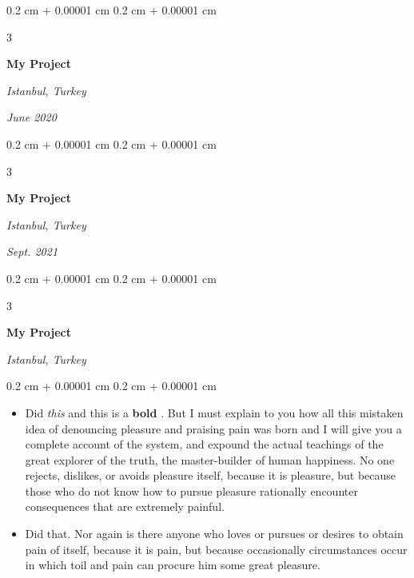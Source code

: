 \documentclass[10pt, letterpaper]{article}
\newenvironment{highlights}{
    \begin{itemize}[
        topsep=0.10 cm,
        parsep=0.10 cm,
        partopsep=0pt,
        itemsep=0pt,
        leftmargin=0.4 cm + 10pt + 0.6 cm
    ]
}{
    \end{itemize}
} %
\newenvironment{onecolentry}{
    \begin{adjustwidth}{
        0.2 cm + 0.00001 cm
    }{
        0.2 cm + 0.00001 cm
    }
}{
    \end{adjustwidth}
} %
\newenvironment{threecolentry}[3][]{
    \onecolentry
    \def\thirdColumn{#3}
    \setcolumnwidth{0.6 cm, \fill, 4.5 cm}
    \begin{paracol}{3}
    #2 \switchcolumn
}{
    \switchcolumn \raggedleft \thirdColumn
    \end{paracol}
    \endonecolentry
} %
\let\hrefWithoutArrow\href
\renewcommand{\href}[2]{\hrefWithoutArrow{#1}{\mbox{\ifthenelse{\equal{#2}{}}{ }{#2 }\raisebox{.15ex}{\footnotesize \faExternalLink*}}}}
\begin{document}
        \vspace{0.2 cm-3px}

        \begin{threecolentry}{
            \vspace*{\fill}
            \textbullet
            \vspace*{3px}
            \vspace*{\fill}
        }{
        \textit{Istanbul, Turkey}    
            
        \textit{June 2020}}
            \textbf{My Project}
        \end{threecolentry}



        \vspace{0.2 cm-3px}

        \begin{threecolentry}{
            \vspace*{\fill}
            \textbullet
            \vspace*{3px}
            \vspace*{\fill}
        }{
        \textit{Istanbul, Turkey}    
            
        \textit{Sept. 2021}}
            \textbf{My Project}
        \end{threecolentry}



        \vspace{0.2 cm-3px}

        \begin{threecolentry}{
            \vspace*{\fill}
            \textbullet
            \vspace*{3px}
            \vspace*{\fill}
        }{
        \textit{Istanbul, Turkey}    
            
        }
            \textbf{My Project}
        \end{threecolentry}

        \vspace{0.10 cm-3px}
        \begin{onecolentry}
            \begin{highlights}
                \item Did \textit{this} and this is a \textbf{bold} \href{https://example.com}{link}. But I must explain to you how all this mistaken idea of denouncing pleasure and praising pain was born and I will give you a complete account of the system, and expound the actual teachings of the great explorer of the truth, the master-builder of human happiness. No one rejects, dislikes, or avoids pleasure itself, because it is pleasure, but because those who do not know how to pursue pleasure rationally encounter consequences that are extremely painful.
                \item Did that. Nor again is there anyone who loves or pursues or desires to obtain pain of itself, because it is pain, but because occasionally circumstances occur in which toil and pain can procure him some great pleasure.
            \end{highlights}
        \end{onecolentry}
\end{document}
